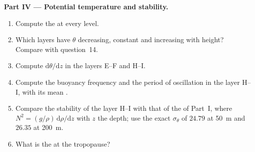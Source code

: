 \begin{problem}
\medskip
\noindent\textbf{Part IV --- Potential temperature and stability.}
\begin{enumerate}[resume]
  \item Compute the  at every level.
  \item Which layers have $\theta$ decreasing, constant and increasing with
        height? Compare with question~14.
  \item Compute $\mathrm d\theta/\mathrm dz$ in the layers E--F and H--I.
  \item Compute the buoyancy frequency and the period of oscillation in the layer
        H--I, with its mean .
  \item Compare the stability of the layer H--I with that of the 
        of Part~I, where $N^2 = (g/\rho)\,\mathrm d\rho/\mathrm dz$ with $z$ the depth; use the
        exact $\sigma_\theta$ of $24.79$ at \qty{50}{m} and $26.35$ at
        \qty{200}{m}.
  \item What is the  at the tropopause?
\end{enumerate}
\end{problem}
